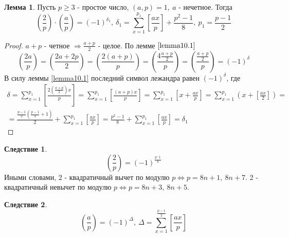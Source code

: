 \documentclass[a4paper, 12pt]{article}
\theoremstyle{definition}
\newtheorem*{consequense}{Следствие}
\newtheorem{lemma}{Лемма}[section]
\begin{document}
    \begin{lemma}\label{lemma10.2}
        Пусть $p\geq 3$ - простое число, $(a,p)=1,\ a$ - нечетное. Тогда
        \[(\frac{2}{p})\cdot(\frac{a}{p})=(-1)^{\delta_1},\ \delta_1=\sum\limits_{x=1}^{p_1}[\frac{ax}{p}]+\frac{p^2-1}{8},\ p_1=\frac{p-1}{2}\]
    \end{lemma} 
    \begin{proof}
        $a+p$ - четное $\Rightarrow \frac{a+p}{2}$ - целое. По лемме $\ref{lemma10.1}$
            \[(\frac{2a}{p})=(\frac{2a+2p}{2})=(\frac{2(a+p)}{p})=(\frac{4\frac{a+p}{2}}{p})=(\frac{\frac{a+p}{2}}{p})=(-1)^{\delta}\]
            В силу леммы \ref{lemma10.1} последний символ лежандра равен $(-1)^{\delta}$, где
            \begin{multline*}
            \delta=\sum\limits_{x=1}^{p_1}[\frac{2(\frac{a+p}{2})x}{p}]=\sum\limits_{x=1}^{p_1}[\frac{(a+p)x}{p}]=\sum\limits_{x=1}^{p_1}[x+\frac{ax}{p}]=\sum\limits_{x=1}^{p_1}(x+[\frac{ax}{2}])=\\=\frac{\frac{p-1}{2}(\frac{p-1}{2}+1)}{2}+\sum\limits_{x=1}^{p_1}[\frac{ax}{p}]=\frac{p^2-1}{8}+\sum\limits_{x=1}^{p_1}[\frac{ax}{p}]=\delta_1
        \end{multline*}
    \end{proof} 
    \begin{consequense}
        \[(\frac{2}{p})=(-1)^{\frac{p^-1}{8}}\] 
        Иными словами, 2 - квадратичный вычет по модулю $p \Leftrightarrow p=8n+1,\ 8n+7$. 2 - квадратичный невычет по модулю $p \Leftrightarrow p=8n+3,\ 8n+5$. 
    \end{consequense} 
    \begin{consequense}
        \[(\frac{a}{p})=(-1)^{\Delta},\ \Delta = \sum\limits_{x=1}^{\frac{p-1}{2}}[\frac{ax}{p}]\]
    \end{consequense} 
\end{document}

